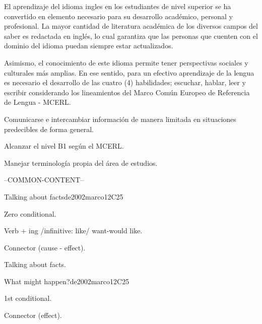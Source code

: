 \begin{syllabus}


\begin{justification}
El aprendizaje del idioma ingles en los estudiantes de nivel superior 
se ha convertido en elemento necesario para su desarrollo académico, personal y 
profesional. La mayor cantidad de literatura académica de los diversos campos 
del saber es redactada en inglés, lo cual garantiza que las personas que 
cuenten con el dominio del idioma puedan siempre estar actualizados. 

Asimismo, el conocimiento de este idioma permite tener perspectivas sociales y 
culturales más amplias. En ese sentido, para un efectivo aprendizaje de la 
lengua es necesario el desarrollo de las cuatro (4) habilidades; escuchar, 
hablar, leer y escribir considerando los lineamientos del 
Marco Común Europeo de Referencia de Lengua - MCERL.
\end{justification}

\begin{goals}
\item Comunicarse e intercambiar información de manera limitada en situaciones predecibles de forma general.
\item Alcanzar el nivel B1 según el MCERL.
\item Manejar terminología propia del área de estudios.
\end{goals}

--COMMON-CONTENT--

\begin{unit}{Talking about facts}{}{de2002marco}{12}{C25}
   \begin{topics}
      \item Zero conditional.
      \item Verb + ing /infinitive: like/ want-would like.
      \item Connector (cause - effect).
   \end{topics}

   \begin{learningoutcomes}
      \item Talking about facts.
   \end{learningoutcomes}
\end{unit}

\begin{unit}{What might happen?}{}{de2002marco}{12}{C25}
   \begin{topics}
      \item 1st conditional.
      \item Connector (effect).
   \end{topics}


\end{unit}
\end{syllabus}
